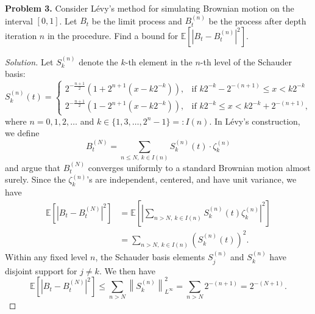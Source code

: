 \documentclass[11pt,letterpaper]{report}
\newcommand{\Lp}[2]{\left\|{#1}\right\|_{L^{#2}}}
\newcommand{\E}{\mathbb{E}}
\newenvironment{solution}
{\begin{proof}[Solution]}
{\end{proof}}
\begin{document}
\noindent\textbf{Problem 3. }
Consider L\'evy's method for simulating Brownian motion on the interval $[0,1]$. Let $B_t$ be the limit process and $B^{(n)}_t$ be the process after depth iteration $n$ in the procedure. Find a bound for $\E[|B_t - B^{(n)}_t|^2]$.
\begin{solution}
	Let $S^{(n)}_k$ denote the $k$-th element in the $n$-th level of the Schauder basis:
	\[
	S^{(n)}_k(t) = \begin{cases}
		2^{-\frac{n+1}{2}}(1 + 2^{n+1}(x-k2^{-k})),&\text{if }k2^{-k}-2^{-(n+1)}\leq x<k2^{-k}\\
		2^{-\frac{n+1}{2}}(1 - 2^{n+1}(x-k2^{-k})),&\text{if }k2^{-k}\leq x<k2^{-k} + 2^{-(n+1)},
	\end{cases}
	\]
	where $n = 0, 1, 2, \ldots$ and $k \in \{1, 3, \ldots, 2^n-1\} =: I(n)$. In L\'evy's construction, we define
	\[
	B^{(N)}_t = \sum_{n\leq N,\ k\in I(n)} S^{(n)}_k(t)\cdot \zeta^{(n)}_k
	\]
	and argue that $B^{(N)}_t$ converges uniformly to a standard Brownian motion almost surely. Since the $\zeta^{(n)}_k$'s are independent, centered, and have unit variance, we have
	\begin{align*}
		\E[|B_t - B^{(N)}_t|^2] &= \E\left[\left|\sum_{n>N,\ k\in I(n)}S^{(n)}_k(t)\zeta_k^{(n)}\right|^2\right]\\
		&= \sum_{n>N,\ k\in I(n)}(S^{(n)}_k(t))^2.
	\end{align*}
	Within any fixed level $n$, the Schauder basis elements $S^{(n)}_j$ and $S^{(n)}_k$ have disjoint support for $j\neq k$. We then have
	\[
	\E[|B_t-B^{(N)}_t|^2] \leq \sum_{n>N}\Lp{S^{(n)}_k}{\infty}^2 = \sum_{n>N}2^{-(n+1)} = 2^{-(N+1)}.
	\]
\end{solution}
\end{document}
